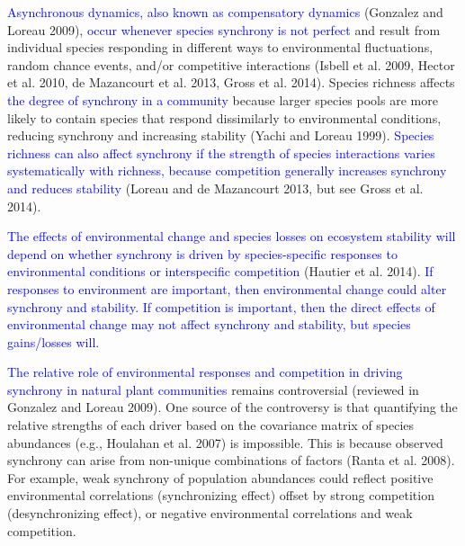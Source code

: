 \documentclass[12pt,]{article}
\begin{document}
\textcolor{blue}{Asynchronous dynamics, also known as compensatory dynamics}
(Gonzalez and Loreau 2009),
\textcolor{blue}{occur whenever species synchrony is not perfect} and
result from individual species responding in different ways to
environmental fluctuations, random chance events, and/or competitive
interactions (Isbell et al. 2009, Hector et al. 2010, {{de Mazancourt}}
et al. 2013, Gross et al. 2014). Species richness affects
\textcolor{blue}{the degree of synchrony in a community} because larger
species pools are more likely to contain species that respond
dissimilarly to environmental conditions, reducing synchrony and
increasing stability (Yachi and Loreau 1999).
\textcolor{blue}{Species richness can also affect synchrony if the strength of species interactions varies systematically with richness, because competition generally increases synchrony and reduces stability}
(Loreau and {{de Mazancourt}} 2013, but see Gross et al. 2014).

\textcolor{blue}{The effects of environmental change and species losses on ecosystem stability will depend on whether synchrony is driven by species-specific responses to environmental conditions or interspecific competition}
(Hautier et al. 2014).
\textcolor{blue}{If responses to environment are important, then environmental change could alter synchrony and stability.
If competition is important, then the direct effects of environmental change may not affect synchrony and stability, but species gains/losses will.}

\textcolor{blue}{The relative role of environmental responses and competition in driving synchrony  in natural plant communities}
remains controversial (reviewed in Gonzalez and Loreau 2009). One source
of the controversy is that quantifying the relative strengths of each
driver based on the covariance matrix of species abundances (e.g.,
Houlahan et al. 2007) is impossible. This is because observed synchrony
can arise from non-unique combinations of factors (Ranta et al. 2008).
For example, weak synchrony of population abundances could reflect
positive environmental correlations (synchronizing effect) offset by
strong competition (desynchronizing effect), or negative environmental
correlations and weak competition.
\end{document}
